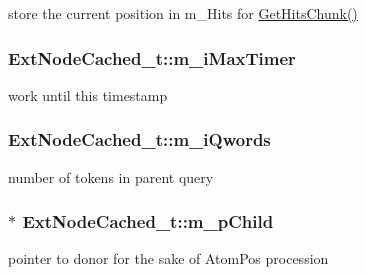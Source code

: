 store the current position in m\-\_\-\-Hits for \hyperlink{classExtNodeCached__t_a0b357bc4f7153168b4919433a4ffb747}{Get\-Hits\-Chunk()} 

\hypertarget{classExtNodeCached__t_a452ccbcf4398b2aa51c70e222cff7fb7}{
\subsubsection[{m\-\_\-i\-Max\-Timer}]{ Ext\-Node\-Cached\-\_\-t\-::m\-\_\-i\-Max\-Timer\hspace{0.3cm}{\ttfamily [private]}}}\label{classExtNodeCached__t_a452ccbcf4398b2aa51c70e222cff7fb7}


work until this timestamp 

\hypertarget{classExtNodeCached__t_a580c8b573809e90bf4bde6059e3f6132}{
\subsubsection[{m\-\_\-i\-Qwords}]{ Ext\-Node\-Cached\-\_\-t\-::m\-\_\-i\-Qwords\hspace{0.3cm}{\ttfamily [private]}}}\label{classExtNodeCached__t_a580c8b573809e90bf4bde6059e3f6132}


number of tokens in parent query 

\hypertarget{classExtNodeCached__t_af2ff5acd56311745d3eb4dc63b4ce5f9}{
\subsubsection[{m\-\_\-p\-Child}]{$\ast$ Ext\-Node\-Cached\-\_\-t\-::m\-\_\-p\-Child\hspace{0.3cm}{\ttfamily [private]}}}\label{classExtNodeCached__t_af2ff5acd56311745d3eb4dc63b4ce5f9}


pointer to donor for the sake of Atom\-Pos procession 

